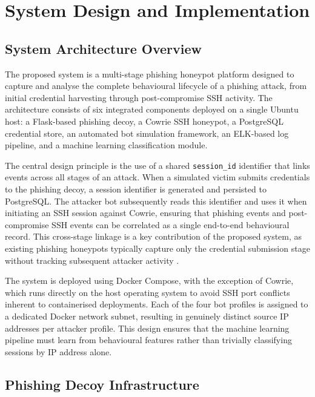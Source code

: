 
\chapter{System Design and Implementation}\label{chapter:chap3}

\section{System Architecture Overview}

The proposed system is a multi-stage phishing honeypot platform designed to
capture and analyse the complete behavioural lifecycle of a phishing attack,
from initial credential harvesting through post-compromise SSH activity. The
architecture consists of six integrated components deployed on a single Ubuntu
host: a Flask-based phishing decoy, a Cowrie SSH honeypot, a PostgreSQL
credential store, an automated bot simulation framework, an ELK-based log
pipeline, and a machine learning classification module.

The central design principle is the use of a shared \texttt{session\_id}
identifier that links events across all stages of an attack. When a simulated
victim submits credentials to the phishing decoy, a session identifier is
generated and persisted to PostgreSQL. The attacker bot subsequently reads this
identifier and uses it when initiating an SSH session against Cowrie, ensuring
that phishing events and post-compromise SSH events can be correlated as a
single end-to-end behavioural record. This cross-stage linkage is a key
contribution of the proposed system, as existing phishing honeypots typically
capture only the credential submission stage without tracking subsequent
attacker activity \cite{Leita2008Phishing,Bringer2012HoneypotSurvey}.

The system is deployed using Docker Compose, with the exception of Cowrie,
which runs directly on the host operating system to avoid SSH port conflicts
inherent to containerised deployments. Each of the four bot profiles is
assigned to a dedicated Docker network subnet, resulting in genuinely distinct
source IP addresses per attacker profile. This design ensures that the machine
learning pipeline must learn from behavioural features rather than trivially
classifying sessions by IP address alone.

\section{Phishing Decoy Infrastructure}

